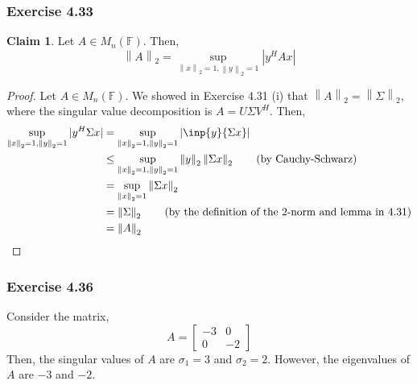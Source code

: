 \documentclass[letterpaper,12pt]{article}
\theoremstyle{definition}
\newtheorem{claim}[theorem]{Claim}
\newcommand{\norm}[1]{\left\lVert#1\right\rVert}
\begin{document}
\subsubsection*{Exercise 4.33}
\begin{claim}
 Let $A \in M_n (\mathbb{F})$. Then, 
 \begin{equation}
 	\norm{A}_2 = \sup_{\norm{x}_2 = 1, \norm{y}_2 = 1} |y^H Ax|
 \end{equation}
\end{claim}
\begin{proof}
	Let $A \in M_n (\mathbb{F})$. We showed in Exercise 4.31 (i) that $\norm{A}_2 = \norm{\Sigma}_2$, where the singular value decomposition is $A = U \Sigma V^H$. Then,
	\begin{align*}
	\sup_{\norm{x}_2 = 1, \norm{y}_2 = 1} |y^H \Sigma x| &= \sup_{\norm{x}_2 = 1, \norm{y}_2 = 1} |\inp{y}{\Sigma x}| \\
	&\leq \sup_{\norm{x}_2 = 1, \norm{y}_2 = 1} \norm{y}_2 \norm{\Sigma x}_2 \tag{by Cauchy-Schwarz} \\
	&= \sup_{\norm{x}_2 = 1}  \norm{\Sigma x}_2 \\
	&= \norm{\Sigma}_2 \tag{by the definition of the 2-norm and lemma in 4.31} \\
	&= \norm{A}_2 
	\end{align*}
\end{proof}

\subsubsection*{Exercise 4.36} 
Consider the matrix,
\begin{equation}
A = \begin{bmatrix}
-3 & 0 \\ 0 & -2
\end{bmatrix}
\end{equation}
Then, the singular values of $A$ are $\sigma_1 = 3$ and $\sigma_2  = 2$.  However, the eigenvalues of $A$ are $-3$ and $-2$. 
\end{document}
